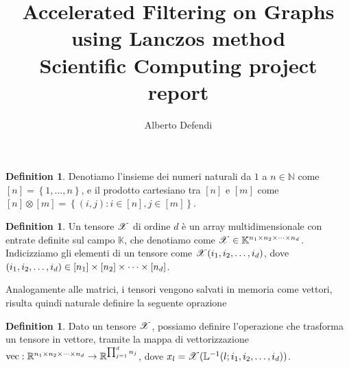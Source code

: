 \documentclass[11pt]{article}
\title{%
    Accelerated Filtering on Graphs using Lanczos method
    \\ \large Scientific Computing project report}
\author{Alberto Defendi}
\date{}
\newcommand{\K}{\mathbb{K}}
\newcommand{\R}{\mathbb{R}}
\newcommand{\N}{\mathbb{N}}
\renewcommand{\L}{\mathbb{L}}
\renewcommand{\vec}[1]{\text{vec}#1}
\theoremstyle{definition}
\newtheorem{definition}[theorem]{Definition}
\theoremstyle{remark}
\begin{document}
\maketitle


\begin{definition}
  Denotiamo l'insieme dei numeri naturali da $ 1 $ a $ n \in \N $ come $ [n] = \left\{ 1,\dots,n
  \right\} $, e il prodotto cartesiano tra $ [n] $ e $ [m] $ come $ [n] \otimes [m] =
  \left\{ (i,j) : i \in [n], j \in [m] \right\} $.
\end{definition}

\begin{definition}
  Un tensore $ \Tn{X}  $ di ordine $ d $ è un array multidimensionale con entrate definite sul campo $
  \K $, che denotiamo come $  \Tn{X} \in \Kmsiz{\K} $. Indicizziamo gli elementi di un tensore come
  $ \Tn{X}(\miwc) $, dove $ (\miwc) \in \mdom$.
\end{definition}

Analogamente alle matrici, i tensori vengono salvati in memoria come vettori, risulta quindi
naturale definire la seguente oprazione
\begin{definition}
  Dato un tensore $ \Tn{X}$, possiamo definire l'operazione che trasforma un tensore in vettore,
  tramite la mappa di vettorizzazione 
  $  \vec : \Rmsiz \to \R^{\prod_{j=1}^d n_j}$, dove $ x_l = \Tn{X}(\L^{-1}(l;\miwc)) $.
\end{definition}

\clearpage


\nocite{*}
\end{document}
